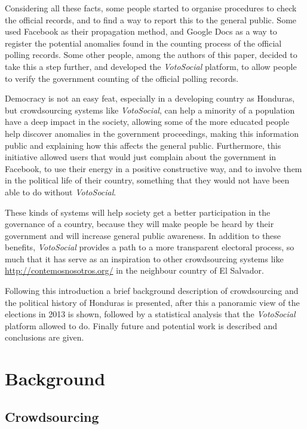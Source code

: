 \documentclass[letterpaper,10pt]{article}
\begin{document}
Considering all these facts, some people started to organise procedures to check the official records, and to find a way to report this to the general public. Some used Facebook as their propagation method, and Google Docs as a way to register the potential anomalies found in the counting process of the official polling records. Some other people, among the authors of this paper, decided to take this a step further, and developed the \textit{VotoSocial} platform, to allow people to verify the government counting of the official polling records.

Democracy is not an easy feat, especially in a developing country as Honduras, but crowdsourcing systems like \textit{VotoSocial}, can help a minority of a population have a deep impact in the society, allowing some of the more educated people help discover anomalies in the government proceedings, making this information public and explaining how this affects the general public. Furthermore, this initiative allowed users that would just complain about the government in Facebook, to use their energy in a positive constructive way, and to involve them in the political life of their country, something that they would not have been able to do without \textit{VotoSocial}.

These kinds of systems will help society get a better participation in the governance of a country, because they will make people be heard by their government and will increase general public awareness. In addition to these benefits, \textit{VotoSocial} provides a path to a more transparent electoral process, so much that it has serve as an inspiration to other crowdsourcing systems like \url{http://contemosnosotros.org/} in the neighbour country of El Salvador. 

Following this introduction a brief background description of crowdsourcing and the political history of Honduras is presented, after this a panoramic view of the elections in 2013 is shown, followed by a statistical analysis that the \textit{VotoSocial} platform allowed to do. Finally future and potential work is described and conclusions are given.


\section{Background}

\subsection{Crowdsourcing}
\end{document}
